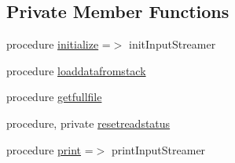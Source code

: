 \subsection*{Private Member Functions}
\begin{DoxyCompactItemize}
\item 
procedure \mbox{\hyperlink{structsimulationinputstreamer__mod_1_1input__streamer__class_a52470b6d47f3ce270f9fdc14ccfa25d5}{initialize}} =$>$ init\+Input\+Streamer
\item 
procedure \mbox{\hyperlink{structsimulationinputstreamer__mod_1_1input__streamer__class_a76d4d67d354652f319fd93a340049cfb}{loaddatafromstack}}
\item 
procedure \mbox{\hyperlink{structsimulationinputstreamer__mod_1_1input__streamer__class_a8fb8a5031b4f6aaf7adb725089f9fd2d}{getfullfile}}
\item 
procedure, private \mbox{\hyperlink{structsimulationinputstreamer__mod_1_1input__streamer__class_aa1582178235a956bb2aae6c98d25fa7a}{resetreadstatus}}
\item 
procedure \mbox{\hyperlink{structsimulationinputstreamer__mod_1_1input__streamer__class_af3faf35d98fba46362d3771ab1dac9ba}{print}} =$>$ print\+Input\+Streamer
\end{DoxyCompactItemize}
